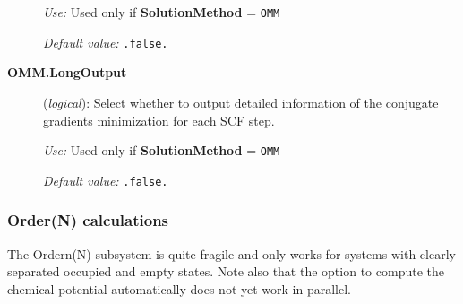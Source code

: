 \documentclass[11pt]{article}
\begin{document}
\begin{description}
{\it Use:} Used only if {\bf SolutionMethod} = {\tt OMM}

{\it Default value:} {\tt .false.}

\item[{\bf OMM.LongOutput}] ({\it logical}):
Select whether to output detailed information of the conjugate gradients minimization for each
SCF step.

{\it Use:} Used only if {\bf SolutionMethod} = {\tt OMM}

{\it Default value:} {\tt .false.}

\end{description}

\subsubsection{Order(N) calculations} \label{SolverON}

The Ordern(N) subsystem is quite fragile and only works for systems
with clearly separated occupied and empty states. Note also that the
option to compute the chemical potential automatically does not yet
work in parallel.
\end{document}
